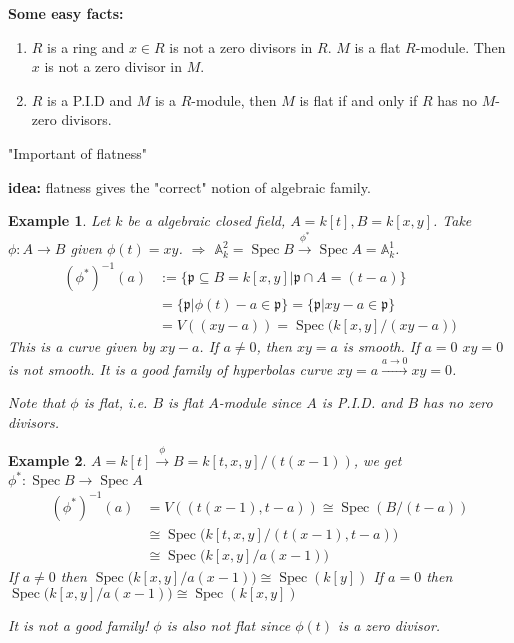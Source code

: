 \documentclass[cs4size]{article}
\newcommand{\su}{\subseteq}
\newcommand{\inv}{^{-1}}
\newcommand{\frp}{\mathfrak{p}}
\newcommand{\bb}{\mathbb}
\newcommand{\xr}{\xrightarrow}
\newcommand{\Ra}{\Rightarrow}
\DeclareMathOperator{\Spec}{Spec}
\newtheorem{ex}{Example}
\begin{document}
\textbf{Some easy facts:}
\begin{enumerate}
\item $R$ is a ring and $x\in R$ is not a zero divisors in $R$. $M$ is a flat $R$-module. Then $x$ is not a zero divisor in $M$.
\item $R$ is a P.I.D and $M$ is a $R$-module, then $M$ is flat if and only if $R$ has no $M$-zero divisors.
\end{enumerate}

"Important of flatness"

\textbf{idea:} flatness gives the "correct" notion of algebraic family.

\begin{ex}
Let $k$ be a algebraic closed field, $A=k[t], B=k[x,y]$. Take $\phi: A\to B$ given $\phi(t)=xy$. $\Ra$ $\bb{A}_k^2=\Spec B\xr{\phi^*}\Spec A=\bb{A}_k^1$.
\begin{align*}
(\phi^*)\inv(a)&:=\{\frp\su B=k[x,y]|\frp\cap A=(t-a)\}\\
&=\{\frp|\phi(t)-a\in \frp\}=\{\frp|xy-a\in\frp\}\\
&=V((xy-a))=\Spec\big(k[x,y]/(xy-a)\big)
\end{align*}
This is a curve given by $xy-a$.
If $a\neq 0$, then $xy=a$ is smooth. If $a=0$ $xy=0$ is not smooth. It is a good family of hyperbolas curve $xy=a\xr{a\to 0}xy=0$.

Note that $\phi$ is flat, i.e. $B$ is flat $A$-module since $A$ is P.I.D. and $B$ has no zero divisors.
\end{ex}

\begin{ex}
$A=k[t]\xr{\phi} B=k[t,x,y]/(t(x-1))$, we get $\phi^*: \Spec B\to \Spec A$
\begin{align*}
(\phi^*)\inv(a)&=V((t(x-1),t-a))\cong \Spec(B/(t-a))\\
&\cong\Spec\big(k[t,x,y]/(t(x-1),t-a)\big)\\
&\cong \Spec\big(k[x,y]/a(x-1)\big)
\end{align*}
If $a\neq 0$ then $\Spec\big(k[x,y]/a(x-1)\big)\cong \Spec(k[y])$
If $a=0$ then $\Spec\big(k[x,y]/a(x-1)\big)\cong \Spec(k[x,y])$

It is not a good family! $\phi$ is also not flat since $\phi(t)$ is a zero divisor.
\end{ex}
\end{document}
